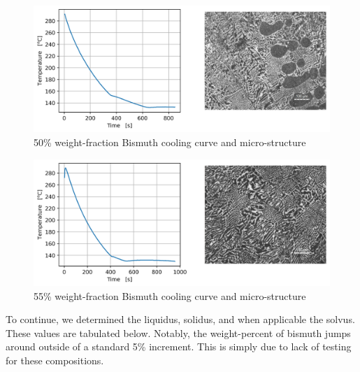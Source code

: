 \documentclass{article}
\begin{document}
\newpage

\begin{figure}[!h!]
    \centering
    \includegraphics[width=1\linewidth]{plots/q2_50.png}
    \caption{50\% weight-fraction Bismuth cooling curve and micro-structure}
    \label{fig:q2-50}
\end{figure}

\begin{figure}[!h!]
    \centering
    \includegraphics[width=1\linewidth]{plots/q2_55.png}
    \caption{55\% weight-fraction Bismuth cooling curve and micro-structure}
    \label{fig:q2-55}
\end{figure}

\newpage

To continue, we determined the liquidus, solidus, and when applicable the solvus. These values are tabulated below. Notably, the weight-percent of bismuth jumps around outside of a standard 5\% increment. This is simply due to lack of testing for these compositions. 
\end{document}
